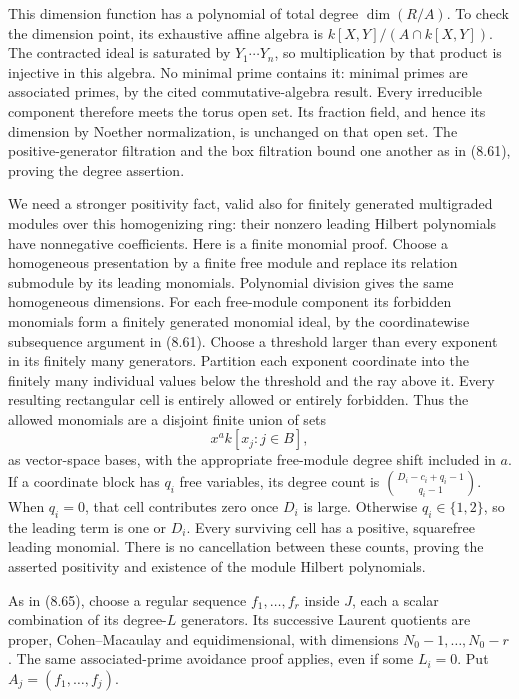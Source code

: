 \documentclass[
  11pt,
  a4paper,
]{article}
\begin{document}
This dimension function has a polynomial of total degree \(\dim(R/A)\).
To check the dimension point, its exhaustive affine algebra is
\(k[X,Y]/(A\cap k[X,Y])\). The contracted ideal is saturated by
\(Y_1\cdots Y_n\), so multiplication by that product is injective in
this algebra. No minimal prime contains it: minimal primes are
associated primes, by the cited commutative-algebra result. Every
irreducible component therefore meets the torus open set. Its fraction
field, and hence its dimension by Noether normalization, is unchanged on
that open set. The positive-generator filtration and the box filtration
bound one another as in (8.61), proving the degree assertion.

We need a stronger positivity fact, valid also for finitely generated
multigraded modules over this homogenizing ring: their nonzero leading
Hilbert polynomials have nonnegative coefficients. Here is a finite
monomial proof. Choose a homogeneous presentation by a finite free
module and replace its relation submodule by its leading monomials.
Polynomial division gives the same homogeneous dimensions. For each
free-module component its forbidden monomials form a finitely generated
monomial ideal, by the coordinatewise subsequence argument in (8.61).
Choose a threshold larger than every exponent in its finitely many
generators. Partition each exponent coordinate into the finitely many
individual values below the threshold and the ray above it. Every
resulting rectangular cell is entirely allowed or entirely forbidden.
Thus the allowed monomials are a disjoint finite union of sets \[
x^a k[x_j:j\in B],
\] as vector-space bases, with the appropriate free-module degree shift
included in \(a\). If a coordinate block has \(q_i\) free variables, its
degree count is \(\binom{D_i-c_i+q_i-1}{q_i-1}\). When \(q_i=0\), that
cell contributes zero once \(D_i\) is large. Otherwise
\(q_i\in\{1,2\}\), so the leading term is one or \(D_i\). Every
surviving cell has a positive, squarefree leading monomial. There is no
cancellation between these counts, proving the asserted positivity and
existence of the module Hilbert polynomials.

As in (8.65), choose a regular sequence \(f_1,\ldots,f_r\) inside \(J\),
each a scalar combination of its degree-\(L\) generators. Its successive
Laurent quotients are proper, Cohen--Macaulay and equidimensional, with
dimensions \(N_0-1,\ldots,N_0-r\). The same associated-prime avoidance
proof applies, even if some \(L_i=0\). Put \(A_j=(f_1,\ldots,f_j)\).
\end{document}
